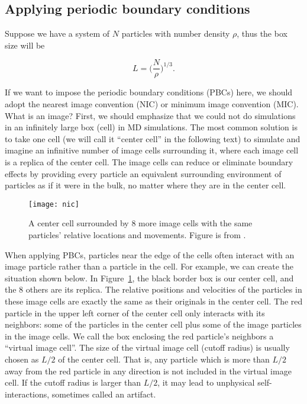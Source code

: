 \subsection{Applying periodic boundary conditions}

Suppose we have a system of $N$ particles with number density $\rho$, thus the
box size will be

\begin{equation}
    L = \biggl( \frac{ N }{ \rho } \biggr)^{1 / 3}.
\end{equation}

If we want to impose the periodic boundary conditions (PBCs) here, we should adopt the
nearest image convention (NIC) or minimum image convention (MIC). What is an image? First,
we should emphasize that we could not do simulations in an infinitely large box (cell) in MD
simulations. The most common solution is to take one cell (we will call it ``center cell''
in the following text) to simulate and imagine an infinitive number of image cells
surrounding it, where each image cell is a replica of the center cell. The image cells can
reduce or eliminate boundary effects by providing every particle an equivalent surrounding
environment of particles as if it were in the bulk, no matter where they are in the center
cell.

\begin{figure}[h]
    \centering
    \texttt{[image: nic]}
    \caption{A center cell surrounded by $8$ more image cells with the same
        particles' relative locations and movements. Figure is from \cite{matlab}.}
    \label{fig:nic}
\end{figure}

When applying PBCs, particles near the edge of the cells often interact
with an image particle rather than a particle in the cell. For example, we can create the
situation shown below.
In Figure~\ref{fig:nic}, the black border box is our center cell, and the $8$ others are
its replica. The relative positions and velocities of the particles in these image cells
are exactly the same as their originals in the center cell. The red particle in the
upper left corner of the center cell only interacts with its neighbors: some of the
particles in the center cell plus some of the image particles in the image cells.
We call the box enclosing the red particle's neighbors a ``virtual image cell''.
The size of the virtual image cell (cutoff radius) is usually chosen as $L / 2$
of the center cell. That is, any particle which is more than $L / 2$ away from the
red particle in any direction is not included in the virtual image cell.
If the cutoff radius is larger than $L / 2$, it may lead to
unphysical self-interactions, sometimes called an artifact.

